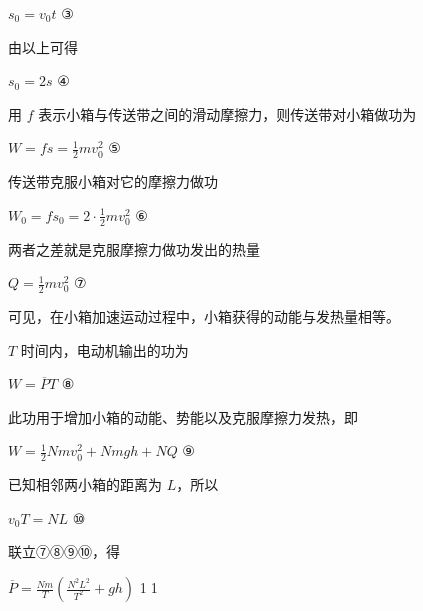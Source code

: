 \documentclass[\gkver]{gaokaozhenti}
\begin{document}
\begin{enumerate}
{$s_{0}=v_{0}t$ ③

由以上可得

$s_{0}=2s$ ④

用 $f$ 表示小箱与传送带之间的滑动摩擦力，则传送带对小箱做功为

$W=fs=\frac{1}{2}mv_{0}^{2}$ ⑤

传送带克服小箱对它的摩擦力做功

$W_{0}=fs_{0}=2\cdot\frac{1}{2}mv_{0}^{2}$ ⑥

两者之差就是克服摩擦力做功发出的热量

$Q=\frac{1}{2}mv_{0}^{2}$ ⑦

可见，在小箱加速运动过程中，小箱获得的动能与发热量相等。

$T$ 时间内，电动机输出的功为

$W=\overline{P}T$ ⑧

此功用于增加小箱的动能、势能以及克服摩擦力发热，即

$W=\frac{1}{2}Nmv_{0}^{2}+Nmgh+NQ$ ⑨

已知相邻两小箱的距离为 $L$，所以

$v_{0}T=NL$ ⑩

联立⑦⑧⑨⑩，得

$\overline{P}=\frac{Nm}{T}\left(\frac{N^{2}L^{2}}{T^{2}}+gh\right)$ \textcircled{11}
}

\end{enumerate}
\end{document}
